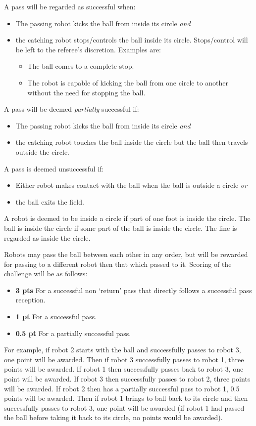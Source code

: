 \documentclass{article}
\begin{document}
A pass will be regarded as successful when:
\begin{itemize}
\item The passing robot kicks the ball from inside its circle \emph{and}
\item the catching robot stops/controls the ball inside its circle. Stops/control will be
left to the referee's discretion. Examples are:
\begin{itemize}
\item The ball comes to a complete stop.
\item The robot is capable of kicking the ball from one circle to another without the need for stopping the ball.
\end{itemize}
\end{itemize}

A pass will be deemed \emph{partially} successful if:
\begin{itemize}
\item The passing robot kicks the ball from inside its circle \emph{and}
\item the catching robot touches the ball inside the circle but the ball then travels outside the circle.
\end{itemize}

A pass is deemed unsuccessful if:
\begin{itemize}
\item Either robot makes contact with the ball when the ball is outside a circle \emph{or}
\item the ball exits the field.
\end{itemize}

A robot is deemed to be inside a circle if part of one foot is inside the circle. The ball is
inside the circle if some part of the ball is inside the circle. The line is regarded as inside the circle.

Robots may pass the ball between each other in any order, but will be rewarded for passing
to a different robot then that which passed to it. Scoring of the challenge will be as
follows:
\begin{itemize}
\item \textbf{3 pts} For a successful non `return' pass that directly follows a successful pass reception.
\item \textbf{1 pt} For a successful pass.
\item \textbf{0.5 pt} For a partially successful pass.
\end{itemize}

For example, if robot 2 starts with the ball and successfully passes to robot 3, one point will be awarded.  Then if robot 3 successfully passes to robot 1, three points will be awarded.  If robot 1 then successfully passes back to robot 3, one point will be awarded.  If robot 3 then successfully passes to robot 2, three points will be awarded.  If robot 2 then has a partially successful pass to robot 1, 0.5 points will be awarded.  Then if robot 1 brings to ball back to its circle and then successfully passes to robot 3, one point will be awarded (if robot 1 had passed the ball before taking it back to its circle, no points would be awarded).
\end{document}
